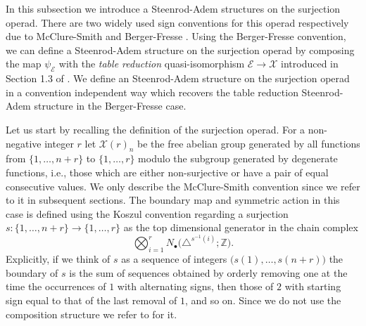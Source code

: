 \documentclass[A4]{amsart}
\theoremstyle{definition}
\newcommand{\Z}{\mathbb{Z}}
\begin{document}
In this subsection we introduce a Steenrod-Adem structures on the surjection operad. There are two widely used sign conventions for this operad respectively due to McClure-Smith \cite{mcclure03cochain} and Berger-Fresse \cite{berger04combinatorial}. Using the Berger-Fresse convention, we can define a Steenrod-Adem structure on the surjection operad by composing the map $\psi_{\mathcal E}$ with the \textit{table reduction} quasi-isomorphism $\mathcal E \to \mathcal X$ introduced in Section 1.3 of \cite{berger04combinatorial}. We define an Steenrod-Adem structure on the surjection operad in a convention independent way which recovers the table reduction Steenrod-Adem structure in the Berger-Fresse case.

Let us start by recalling the definition of the surjection operad. For a non-negative integer $r$ let $\mathcal X(r)_n$ be the free abelian group generated by all functions from $\{1, \dots, n+r\}$ to $\{1, \dots, r\}$ modulo the subgroup generated by degenerate functions, i.e., those which are either non-surjective or have a pair of equal consecutive values. We only describe the McClure-Smith convention since we refer to it in subsequent sections. The boundary map and symmetric action in this case is defined using the Koszul convention regarding a surjection $s : \{1, \dots, n+r\} \to \{1, \dots, r\} $ as the top dimensional generator in the chain complex
\begin{equation} \label{eq: surjection boundary}
\bigotimes_{i = 1}^r N_\bullet \big( \triangle^{s^{-1}(i)}; \Z \big).
\end{equation}
Explicitly, if we think of $s$ as a sequence of integers $\big( s(1), \dots, s(n+r) \big)$ the boundary of $s$ is the sum of sequences obtained by orderly removing one at the time the occurrences of $1$ with alternating signs, then those of $2$ with starting sign equal to that of the last removal of $1$, and so on. Since we do not use the composition structure we refer to \cite{mcclure03cochain} for it.
\end{document}
